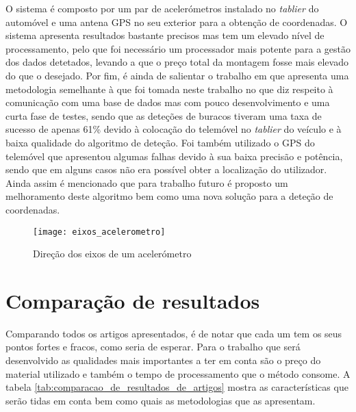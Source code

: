 O sistema é composto por um par de acelerómetros instalado no \emph{tablier} do automóvel e uma antena GPS no seu exterior para a obtenção de coordenadas.
O sistema apresenta resultados bastante precisos mas tem um elevado nível de processamento, pelo que foi necessário um processador mais potente para a gestão dos dados detetados, levando a que o preço total da montagem fosse mais elevado do que o desejado. 
Por fim, é ainda de salientar o trabalho em \cite{Kattan2014} que apresenta uma metodologia semelhante à que foi tomada neste trabalho no que diz respeito à comunicação com uma base de dados mas com pouco desenvolvimento e uma curta fase de testes, sendo que as deteções de buracos tiveram uma taxa de sucesso de apenas 61\% devido à colocação do telemóvel no \emph{tablier} do veículo e à baixa qualidade do algoritmo de deteção.
Foi também utilizado o GPS do telemóvel que apresentou algumas falhas devido à sua baixa precisão e potência, sendo que em alguns casos não era possível obter a localização do utilizador.
Ainda assim é mencionado que para trabalho futuro é proposto um melhoramento deste algoritmo bem como uma nova solução para a deteção de coordenadas.

\begin{figure}[hbtp]
	\centering
	\texttt{[image: eixos\_acelerometro]}
	\caption{Direção dos eixos de um acelerómetro}
	\label{fig:direcao_dos_eixos_de_um_acelerometro}
\end{figure}

\section{Comparação de resultados} %
\label{sec:comapracao_de_resultados}

Comparando todos os artigos apresentados, é de notar que cada um tem os seus pontos fortes e fracos, como seria de esperar. Para o trabalho que será desenvolvido as qualidades mais importantes a ter em conta são o preço do material utilizado e também o tempo de processamento que o método consome. A tabela \ref{tab:comparacao_de_resultados_de_artigos} mostra as características que serão tidas em conta bem como quais as metodologias que as apresentam.

